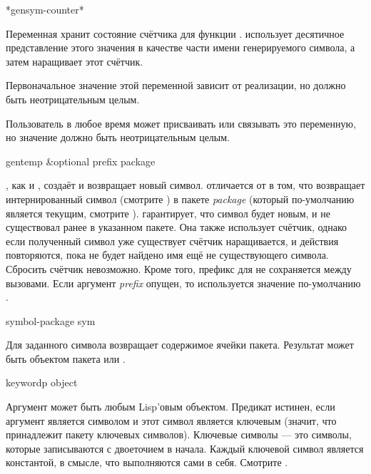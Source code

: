 \begin{newer}
\begin{defun}[Переменная]
*gensym-counter*

Переменная хранит состояние счётчика для функции . 
использует десятичное представление этого значения в качестве части имени
генерируемого символа, а затем наращивает этот счётчик.

Первоначальное значение этой переменной зависит от реализации, но должно быть
неотрицательным целым.

Пользователь в любое время может присваивать или связывать это переменную, но
значение должно быть неотрицательным целым.
\end{defun}
\end{newer}

\begin{defun}[Функция]
gentemp &optional prefix package

, как и , создаёт и возвращает новый символ.
 отличается от  в том, что возвращает интернированный
символ (смотрите ) в пакете \emph{package} (который по-умолчанию
является текущим, смотрите ).  гарантирует, что
символ будет новым, и не существовал ранее в указанном пакете. Она также
использует счётчик, однако если полученный символ уже существует счётчик
наращивается, и действия повторяются, пока не будет найдено имя ещё не
существующего символа.
Сбросить счётчик невозможно.
Кроме того, префикс для  не сохраняется между вызовами. Если
аргумент \emph{prefix} опущен, то используется значение по-умолчанию .
\end{defun}

\begin{defun}[Функция]
symbol-package sym

Для заданного символа возвращает содержимое ячейки пакета. Результат может быть
объектом пакета или {\nil}.
\end{defun}

\begin{defun}[Функция]
keywordp object

Аргумент может быть любым Lisp'овым объектом. Предикат  истинен,
если аргумент является символом и этот символ является ключевым (значит, что
принадлежит пакету ключевых символов). Ключевые символы --- это символы, которые
записываются с двоеточием в начала. Каждый ключевой символ является константой,
в смысле, что выполняются сами в себя. Смотрите .
\end{defun}

\fi